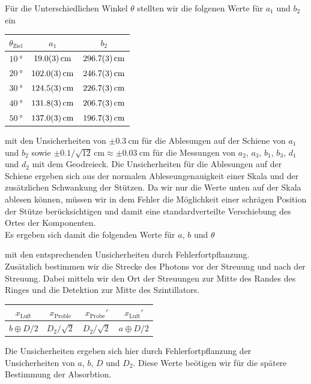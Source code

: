 Für die Unterschiedlichen Winkel $\theta$ stellten wir die folgenen Werte für $a_1$ und $b_2$ ein
\begin{center}
    \begin{tabular}{|c|c|c|}
        \hline
        $\theta_{\text{Ziel}}$ & $a_1$ & $b_2$ \\
        \hline
        $\SI{10}{\degree}$ & $\SI{19.0 \pm 0.3}{\centi\meter}$ & $\SI{296.7 \pm 0.3}{\centi\meter}$ \\
        \hline
        $\SI{20}{\degree}$ & $\SI{102.0 \pm 0.3}{\centi\meter}$ & $\SI{246.7 \pm 0.3}{\centi\meter}$ \\
        \hline
        $\SI{30}{\degree}$ & $\SI{124.5 \pm 0.3}{\centi\meter}$ & $\SI{226.7 \pm 0.3}{\centi\meter}$ \\
        \hline
        $\SI{40}{\degree}$ & $\SI{131.8 \pm 0.3}{\centi\meter}$ & $\SI{206.7 \pm 0.3}{\centi\meter}$ \\
        \hline
        $\SI{50}{\degree}$ & $\SI{137.0 \pm 0.3}{\centi\meter}$ & $\SI{196.7 \pm 0.3}{\centi\meter}$ \\
        \hline
    \end{tabular}
\end{center}
mit den Unsicherheiten von $\pm \SI{0.3}{\centi\meter}$ für die Ablesungen auf der Schiene von $a_1$ und $b_2$ sowie $\pm 0.1/\sqrt{12}\,\unit{\centi\meter}\approx \pm \SI{0.03}{\centi\meter}$ für die Messungen von $a_2$, $a_3$, $b_1$, $b_3$, $d_1$ und $d_2$ mit dem Geodreieck. Die Unsicherheiten für die Ablesungen auf der Schiene ergeben sich aus der normalen Ableseungenauigkeit einer Skala und der zusätzlichen Schwankung der Stützen. Da wir nur die Werte unten auf der Skala ablesen können, müssen wir in dem Fehler die Möglichkeit einer schrägen Position der Stütze berücksichtigen und damit eine standardverteilte Verschiebung des Ortes der Komponenten.\\
Es ergeben sich damit die folgenden Werte für $a$, $b$ und $\theta$
\begin{center}
    
\end{center}
mit den entsprechenden Unsicherheiten durch Fehlerfortpflanzung.\\
Zusätzlich bestimmen wir die Strecke des Photons vor der Streuung und nach der Streuung. Dabei mitteln wir den Ort der Streuungen zur Mitte des Randes des Ringes und die Detektion zur Mitte des Szintillators.
\begin{center}
    \begin{tabular}{|c|c|c|c|}
        \hline
        $x_{\text{Luft}}$ & $x_{\text{Proble}}$ & $x_{\text{Probe}}'$ & $x_{\text{Luft}}'$ \\
        \hline
        $b \oplus D/2$ & $D_2/\sqrt{2}$ & $D_2/\sqrt{2}$ & $a \oplus D/2$ \\
        \hline
    \end{tabular}
\end{center}
Die Unsicherheiten ergeben sich hier durch Fehlerfortpflanzung der Unsicherheiten von $a$, $b$, $D$ und $D_2$. Diese Werte beötigen wir für die spätere Bestimmung der Absorbtion.

